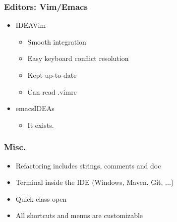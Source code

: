 \begin{frame}
  \frametitle{Editors: Vim/Emacs}
  \begin{itemize}
    \item IDEAVim
      \begin{itemize}
        \item Smooth integration
        \item Easy keyboard conflict resolution
        \item Kept up-to-date
        \item Can read .vimrc
      \end{itemize}
    \item emacsIDEAs
      \begin{itemize}
        \item It exists.
      \end{itemize}
  \end{itemize}
\end{frame}

\begin{frame}
  \frametitle{Misc.}
  \begin{itemize}
    \item Refactoring includes strings, comments and doc
    \item Terminal inside the IDE (Windows, Maven, Git, ...)
    \item Quick class open
    \item All shortcuts and menus are customizable
  \end{itemize}
\end{frame}

